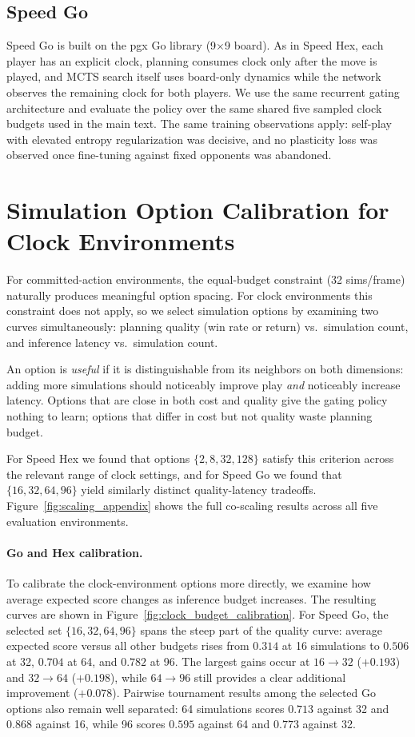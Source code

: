 \documentclass{article}
\begin{document}
\subsection{Speed Go}
Speed Go is built on the pgx Go library (9$\times$9 board).
As in Speed Hex, each player has an explicit clock, planning consumes clock only
after the move is played, and MCTS search itself uses board-only dynamics while the
network observes the remaining clock for both players.
We use the same recurrent gating architecture and evaluate the policy over the same
shared five sampled clock budgets used in the main text.
The same training observations apply: self-play with elevated entropy regularization
was decisive, and no plasticity loss was observed once fine-tuning against fixed
opponents was abandoned.


\section{Simulation Option Calibration for Clock Environments}
\label{app:sim_calibration}

For committed-action environments, the equal-budget constraint (32 sims/frame) naturally
produces meaningful option spacing.
For clock environments this constraint does not apply, so we select simulation options
by examining two curves simultaneously: planning quality (win rate or return) vs.\
simulation count, and inference latency vs.\ simulation count.

An option is \emph{useful} if it is distinguishable from its neighbors on both dimensions:
adding more simulations should noticeably improve play \emph{and} noticeably increase
latency.
Options that are close in both cost and quality give the gating policy nothing to learn;
options that differ in cost but not quality waste planning budget.

For Speed Hex we found that options $\{2, 8, 32, 128\}$ satisfy this criterion across
the relevant range of clock settings, and for Speed Go we found that
$\{16, 32, 64, 96\}$ yield similarly distinct quality-latency tradeoffs.
Figure~\ref{fig:scaling_appendix} shows the full co-scaling results across all five
evaluation environments.

\paragraph{Go and Hex calibration.}
To calibrate the clock-environment options more directly, we examine how average
expected score changes as inference budget increases.
The resulting curves are shown in Figure~\ref{fig:clock_budget_calibration}.
For Speed Go, the selected set $\{16, 32, 64, 96\}$ spans the steep part of the
quality curve: average expected score versus all other budgets rises from $0.314$
at 16 simulations to $0.506$ at 32, $0.704$ at 64, and $0.782$ at 96.
The largest gains occur at $16{\rightarrow}32$ ($+0.193$) and
$32{\rightarrow}64$ ($+0.198$), while $64{\rightarrow}96$ still provides a clear
additional improvement ($+0.078$).
Pairwise tournament results among the selected Go options also remain well
separated: 64 simulations scores $0.713$ against 32 and $0.868$ against 16,
while 96 scores $0.595$ against 64 and $0.773$ against 32.
\end{document}

